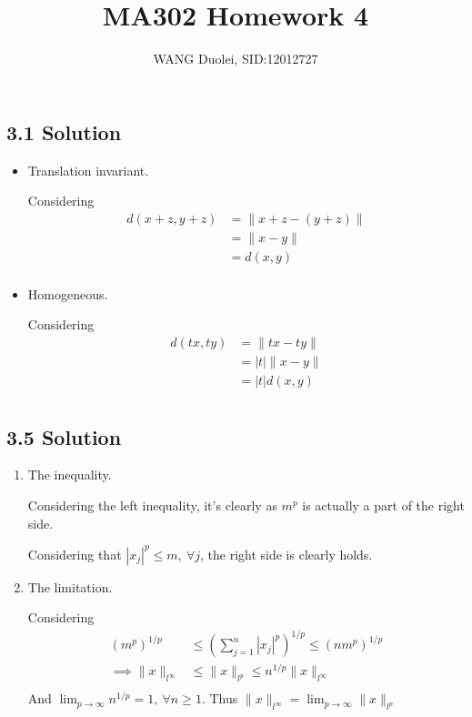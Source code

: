 \documentclass{article}
\title{MA302 Homework 4}
\author{WANG Duolei, SID:12012727}
\affil{wangdl2020@mail.sustech.edu.cn}
\date{}
\begin{document}
\maketitle

\subsection*{3.1 Solution}
\begin{itemize}
    \item Translation invariant.
    
    Considering
    \begin{align*}
        d(x + z, y + z) &= \|x + z - (y + z)\|\\
        &= \|x - y\|\\
        &= d(x, y)\\
    \end{align*}

    \item Homogeneous.
    
    Considering
    \begin{align*}
        d(tx, ty) &= \|tx - ty\|\\
        &= |t|\|x - y\|\\
        &= |t|d(x, y)\\
    \end{align*}
\end{itemize}


\subsection*{3.5 Solution}
\begin{enumerate}
    \item The inequality.
    
    Considering the left inequality, it's clearly as \(m^p\) is actually a part of the right side. 

    Considering that \(|x_j|^p \le m,\ \forall j\), the right side is clearly holds.

    \item The limitation.
    
    Considering
    \begin{align*}
        {(m^p)}^{1/p} &\le (\sum_{j = 1}^n |x_j|^p)^{1/p} \le {(nm^p)}^{1/p} \\
        \implies \|x\|_{l^\infty} &\le \|x\|_{l^p} \le n^{1/p}\|x\|_{l^\infty}\\
    \end{align*}
    And \(\lim_{p \to \infty} n^{1/p} = 1,\ \forall n \ge 1\). Thus 
    \(\|x\|_{l^\infty} = \lim_{p \to \infty}\|x\|_{l^p}\)
\end{enumerate}
\end{document}
